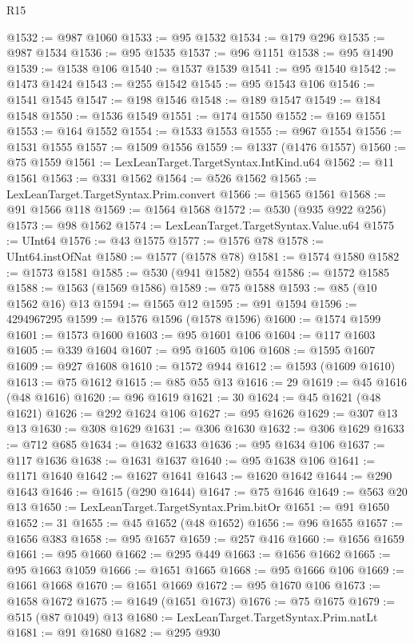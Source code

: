 \begin{lexlean}{R15}
\begin{coremodule}
{{{{{{{{{{{{{{{{{{{{{{{{{{{{{{{{{{{{{{{{{{{{{{{{{{{{{{{{{{{{{{{{{{{{{{@1532 := @987 @1060
@1533 := @95 @1532
@1534 := @179 @296
@1535 := @987 @1534
@1536 := @95 @1535
@1537 := @96 @1151
@1538 := @95 @1490
@1539 := @1538 @106
@1540 := @1537 @1539
@1541 := @95 @1540
@1542 := @1473 @1424
@1543 := @255 @1542
@1545 := @95 @1543 @106
@1546 := @1541 @1545
@1547 := @198 @1546
@1548 := @189 @1547
@1549 := @184 @1548
@1550 := @1536 @1549
@1551 := @174 @1550
@1552 := @169 @1551
@1553 := @164 @1552
@1554 := @1533 @1553
@1555 := @967 @1554
@1556 := @1531 @1555
@1557 := @1509 @1556
@1559 := @1337 (@1476 @1557)
@1560 := @75 @1559
@1561 := LexLeanTarget.TargetSyntax.IntKind.u64
@1562 := @11 @1561
@1563 := @331 @1562
@1564 := @526 @1562
@1565 := LexLeanTarget.TargetSyntax.Prim.convert
@1566 := @1565 @1561
@1568 := @91 @1566 @118
@1569 := @1564 @1568
@1572 := @530 (@935 @922 @256)
@1573 := @98 @1562
@1574 := LexLeanTarget.TargetSyntax.Value.u64
@1575 := UInt64
@1576 := @43 @1575
@1577 := @1576 @78
@1578 := UInt64.instOfNat
@1580 := @1577 (@1578 @78)
@1581 := @1574 @1580
@1582 := @1573 @1581
@1585 := @530 (@941 @1582) @554
@1586 := @1572 @1585
@1588 := @1563 (@1569 @1586)
@1589 := @75 @1588
@1593 := @85 (@10 @1562 @16) @13
@1594 := @1565 @12
@1595 := @91 @1594
@1596 := 4294967295
@1599 := @1576 @1596 (@1578 @1596)
@1600 := @1574 @1599
@1601 := @1573 @1600
@1603 := @95 @1601 @106
@1604 := @117 @1603
@1605 := @339 @1604
@1607 := @95 @1605 @106
@1608 := @1595 @1607
@1609 := @927 @1608
@1610 := @1572 @944
@1612 := @1593 (@1609 @1610)
@1613 := @75 @1612
@1615 := @85 @55 @13
@1616 := 29
@1619 := @45 @1616 (@48 @1616)
@1620 := @96 @1619
@1621 := 30
@1624 := @45 @1621 (@48 @1621)
@1626 := @292 @1624 @106
@1627 := @95 @1626
@1629 := @307 @13 @13
@1630 := @308 @1629
@1631 := @306 @1630
@1632 := @306 @1629
@1633 := @712 @685
@1634 := @1632 @1633
@1636 := @95 @1634 @106
@1637 := @117 @1636
@1638 := @1631 @1637
@1640 := @95 @1638 @106
@1641 := @1171 @1640
@1642 := @1627 @1641
@1643 := @1620 @1642
@1644 := @290 @1643
@1646 := @1615 (@290 @1644)
@1647 := @75 @1646
@1649 := @563 @20 @13
@1650 := LexLeanTarget.TargetSyntax.Prim.bitOr
@1651 := @91 @1650
@1652 := 31
@1655 := @45 @1652 (@48 @1652)
@1656 := @96 @1655
@1657 := @1656 @383
@1658 := @95 @1657
@1659 := @257 @416
@1660 := @1656 @1659
@1661 := @95 @1660
@1662 := @295 @449
@1663 := @1656 @1662
@1665 := @95 @1663 @1059
@1666 := @1651 @1665
@1668 := @95 @1666 @106
@1669 := @1661 @1668
@1670 := @1651 @1669
@1672 := @95 @1670 @106
@1673 := @1658 @1672
@1675 := @1649 (@1651 @1673)
@1676 := @75 @1675
@1679 := @515 (@87 @1049) @13
@1680 := LexLeanTarget.TargetSyntax.Prim.natLt
@1681 := @91 @1680
@1682 := @295 @930
}}}}}}}}}}}}}}}}}}}}}}}}}}}}}}}}}}}}}}}}}}}}}}}}}}}}}}}}}}}}}}}}}}}}}}
\end{coremodule}
\end{lexlean}
